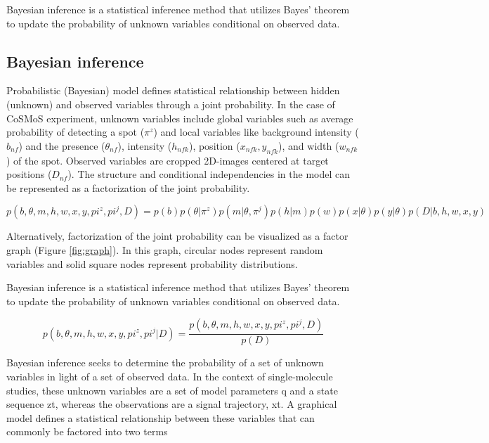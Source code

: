 Bayesian inference is a statistical inference method that utilizes Bayes' theorem to update the probability of unknown variables conditional on observed data.

\subsection{Bayesian inference}

Probabilistic (Bayesian) model defines statistical relationship between hidden (unknown) and observed variables through a joint probability. In the case of CoSMoS experiment, unknown variables include global variables such as average probability of detecting a spot ($\pi^z$) and local variables like background intensity ($b_{nf}$) and the presence ($\theta_{nf}$), intensity ($h_{nfk}$), position ($x_{nfk}, y_{nfk}$), and width ($w_{nfk}$) of the spot. Observed variables are cropped 2D-images centered at target positions ($D_{nf}$). The structure and conditional independencies in the model can be represented as a factorization of the joint probability.

\textbf{\begin{equation*}
    p(b,\theta,m,h,w,x,y,pi^z,pi^j,D) = p(b)p(\theta|\pi^z)p(m|\theta,\pi^j)p(h|m)p(w)p(x|\theta)p(y|\theta)p(D|b,h,w,x,y)
\end{equation*}}

Alternatively, factorization of the joint probability can be visualized as a factor graph (Figure \ref{fig:graph}). In this graph, circular nodes represent random variables and solid square nodes represent probability distributions.

Bayesian inference is a statistical inference method that utilizes Bayes' theorem to update the probability of unknown variables conditional on observed data.

\textbf{\begin{equation*}
    p(b,\theta,m,h,w,x,y,pi^z,pi^j|D) = 
    \dfrac{p(b,\theta,m,h,w,x,y,pi^z,pi^j,D)}{p(D)}
\end{equation*}}

Bayesian inference seeks to determine the probability of a set of unknown
variables in light of a set of observed data. In the context of single-molecule
studies, these unknown variables are a set of model parameters q and a state
sequence zt, whereas the observations are a signal trajectory, xt. A graphical
model defines a statistical relationship between these variables that can
commonly be factored into two terms

